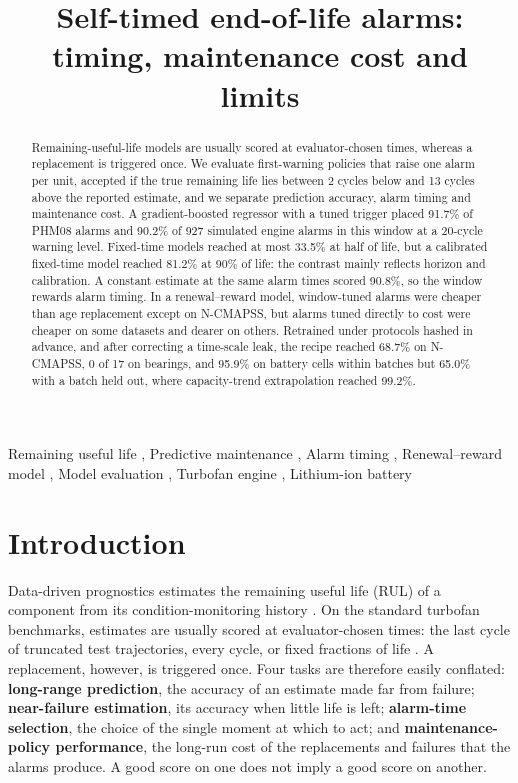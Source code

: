 \documentclass[a4paper,fleqn,doubleblind]{cas-dc}
\begin{document}
\let\WriteBookmarks\relax
\let\printorcid\relax
\def\floatpagepagefraction{1}
\def\textpagefraction{.001}
\title [mode = title]{Self-timed end-of-life alarms: timing, maintenance cost and limits}
\begin{abstract}
Remaining-useful-life models are usually scored at evaluator-chosen times, whereas a replacement is triggered once. We evaluate first-warning policies that raise one alarm per unit, accepted if the true remaining life lies between 2 cycles below and 13 cycles above the reported estimate, and we separate prediction accuracy, alarm timing and maintenance cost. A gradient-boosted regressor with a tuned trigger placed 91.7\% of PHM08 alarms and 90.2\% of 927 simulated engine alarms in this window at a 20-cycle warning level. Fixed-time models reached at most 33.5\% at half of life, but a calibrated fixed-time model reached 81.2\% at 90\% of life: the contrast mainly reflects horizon and calibration. A constant estimate at the same alarm times scored 90.8\%, so the window rewards alarm timing. In a renewal--reward model, window-tuned alarms were cheaper than age replacement except on N-CMAPSS, but alarms tuned directly to cost were cheaper on some datasets and dearer on others. Retrained under protocols hashed in advance, and after correcting a time-scale leak, the recipe reached 68.7\% on N-CMAPSS, 0 of 17 on bearings, and 95.9\% on battery cells within batches but 65.0\% with a batch held out, where capacity-trend extrapolation reached 99.2\%.
\end{abstract}
\begin{keywords}
Remaining useful life \sep
Predictive maintenance \sep
Alarm timing \sep
Renewal--reward model \sep
Model evaluation \sep
Turbofan engine \sep
Lithium-ion battery
\end{keywords}
\maketitle
\linenumbers
\section{Introduction}\label{sec:1}

Data-driven prognostics estimates the remaining useful life (RUL) of a component from its condition-monitoring history \cite{lei2018,si2011}. On the standard turbofan benchmarks, estimates are usually scored at evaluator-chosen times: the last cycle of truncated test trajectories, every cycle, or fixed fractions of life \cite{ramasso2014}. A replacement, however, is triggered once. Four tasks are therefore easily conflated: \textbf{long-range prediction}, the accuracy of an estimate made far from failure; \textbf{near-failure estimation}, its accuracy when little life is left; \textbf{alarm-time selection}, the choice of the single moment at which to act; and \textbf{maintenance-policy performance}, the long-run cost of the replacements and failures that the alarms produce. A good score on one does not imply a good score on another.
\end{document}
